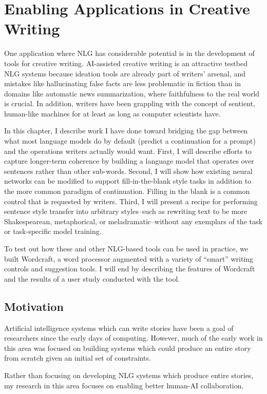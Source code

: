 \chapter{Enabling Applications in Creative Writing}
\label{chap:creativity}
One application where NLG has considerable potential is in the development of tools for creative writing. AI-assisted creative writing is an attractive testbed NLG systems because ideation tools are already part of writers' arsenal, and mistakes like hallucinating false facts are less problematic in fiction than in domains like automatic news summarization, where faithfulness to the real world is crucial. In addition, writers have been grappling with the concept of sentient, human-like machines for at least as long as computer scientists have.

In this chapter, I describe work I have done toward bridging the gap between what most language models do by default (predict a continuation for a prompt) and the operations writers actually would want.
First, I will describe efforts to capture longer-term coherence by building a language model that operates over sentences rather than other sub-words.
Second, I will show how existing neural networks can be modified to support fill-in-the-blank style tasks in addition to the more common paradigm of continuation.
Filling in the blank is a common control that is requested by writers.
Third, I will present a recipe for performing sentence style transfer into arbitrary styles--such as rewriting text to be more Shakespearean, metaphorical, or meladramatic--without any exemplars of the task or task-specific model training.

To test out how these and other NLG-based tools can be used in practice, we built Wordcraft, a word processor augmented with a variety of ``smart'' writing controls and suggestion tools.
I will end by describing the features of Wordcraft and the results of a user study conducted with the tool.

\section{Motivation}
Artificial intelligence systems which can write stories have been a goal of researchers since the early days of computing.
However, much of the early work in this area was focused on building systems which could produce an entire story from scratch given an initial set of constraints.

Rather than focusing on developing NLG systems which produce entire stories, my research in this area focuses on enabling better human-AI collaboration.


